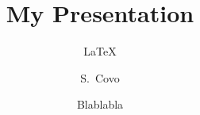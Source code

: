 \title[Presentation] %
{My Presentation}
\subtitle{\LaTeX}
\author[Covo] %
{S.~Covo}
\date[\today] %
{Blablabla}
\subject{Latex}

\frame{\titlepage}

